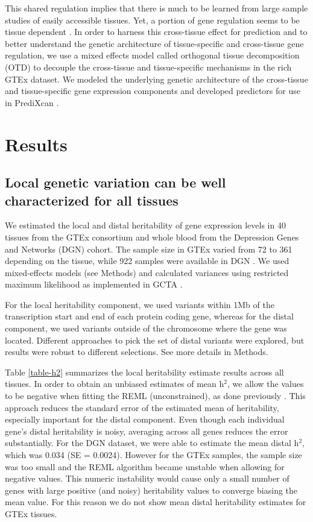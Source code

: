 \documentclass[10pt,letterpaper]{article}
\begin{document}
This shared regulation implies that there is much to be learned from large sample studies of easily accessible tissues. Yet, a portion of gene regulation seems to be tissue dependent \cite{Ardlie_2015}. In order to harness this cross-tissue effect for prediction and to better understand the genetic architecture of tissue-specific and cross-tissue gene regulation, we use a mixed effects model called orthogonal tissue decomposition (OTD) to decouple the cross-tissue and tissue-specific mechanisms in the rich GTEx dataset. We modeled the underlying genetic architecture of the cross-tissue and tissue-specific gene expression components and developed predictors for use in PrediXcan \cite{Gamazon_2015}.



\section*{Results}
\subsection*{Local genetic variation can be well characterized for all
tissues}\label{local-genetic-variation-can-be-well-characterized-for-all-tissues}

We estimated the local and distal heritability of gene expression levels in 40 tissues from the GTEx consortium and whole blood from the Depression Genes and Networks (DGN) cohort. The sample size in GTEx varied from 72 to 361 depending on the tissue, while 922 samples were available in DGN \cite{Battle_2013}. We used mixed-effects models (see Methods) and calculated variances using restricted maximum likelihood as implemented in GCTA \cite{Yang_2011}.

For the local heritability component, we used variants within 1Mb of the transcription start and end of each protein coding gene, whereas for the distal component, we used variants outside of the chromosome where the gene was located. Different approaches to pick the set of distal variants were explored, but results were robust to different selections. See more details in Methods.

Table \ref{table-h2} summarizes the local heritability estimate results across all tissues. In order to obtain an unbiased estimates of mean h$^2$, we allow the values to be negative when fitting the REML (unconstrained), as done previously \cite{Price_2011,Wright_2014}. This approach reduces the standard error of the estimated mean of heritability, especially important for the distal component. Even though each individual gene's distal heritability is noisy, averaging across all genes reduces the error substantially. For the DGN dataset, we were able to estimate the mean distal h$^2$, which was 0.034 (SE = 0.0024). However for the GTEx samples, the sample size was too small and the REML algorithm became unstable when allowing for negative values. This numeric instability would cause only a small number of genes with large positive (and noisy) heritability values to converge biasing the mean value. For this reason we do not show mean distal heritability estimates for GTEx tissues. 
\end{document}
